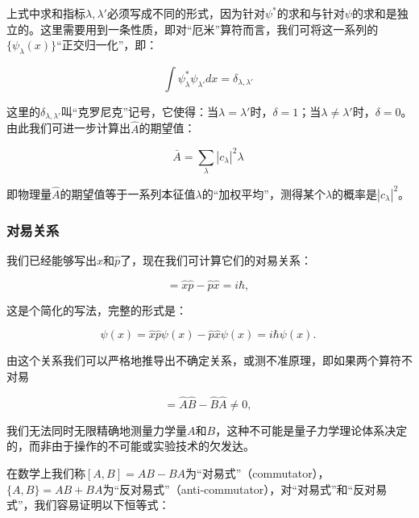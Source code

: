 上式中求和指标$\lambda, \lambda'$必须写成不同的形式，因为针对$\psi^*$的求和与针对$\psi$的求和是独立的。这里需要用到一条性质，即对“厄米”算符而言，我们可将这一系列的$\{ \psi_{\lambda}(x) \}$“正交归一化”，即：

\begin{equation}
    \int \psi^*_{\lambda}\psi_{\lambda'}dx = \delta_{\lambda,\lambda'}~
\end{equation}

这里的$\delta_{\lambda,\lambda'}$叫“克罗尼克”记号，它使得：当$\lambda = \lambda'$时，$\delta = 1$；当$\lambda \ne \lambda'$时，$\delta = 0$。由此我们可进一步计算出$\hat A$的期望值：

\begin{equation}
\bar A = \sum\limits_{\lambda} |c_{\lambda}|^2 \lambda~
\end{equation}

即物理量$\hat A$的期望值等于一系列本征值$\lambda$的“加权平均”，测得某个$\lambda$的概率是$|c_{\lambda}|^2$。

\subsubsection{对易关系}

我们已经能够写出$\hat x$和$\hat p$了，现在我们可计算它们的对易关系：

\begin{equation}
[\hat x, \hat p] = \hat x \hat p - \hat p \hat x = i \hbar,~
\end{equation}

这是个简化的写法，完整的形式是：

\begin{equation}
[\hat x, \hat p]\psi(x) = \hat x \hat p \psi(x) - \hat p \hat x
\psi(x)= i \hbar \psi(x).~
\end{equation}

由这个关系我们可以严格地推导出不确定关系，或测不准原理，即如果两个算符不对易

\begin{equation}
[\hat A, \hat B] =\hat A \hat B - \hat B \hat A  \neq 0 ,~
\end{equation}

我们无法同时无限精确地测量力学量$A$和$B$，这种不可能是量子力学理论体系决定的，而非由于操作的不可能或实验技术的欠发达。

在数学上我们称$[A, B]=AB-BA$为“对易式”（commutator），$\{ A,B \} = AB + BA$为“反对易式”（anti-commutator），对“对易式”和“反对易式”，我们容易证明以下恒等式：

